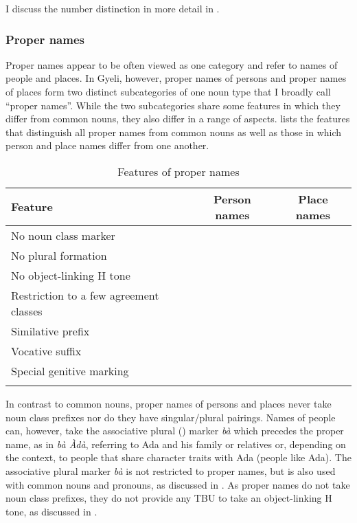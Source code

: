 \noindent I discuss the number distinction in more detail in .






\subsubsection{Proper names}
\largerpage[-2]
\label{sec:properN}


Proper names appear to be often viewed as one category and refer to names of people and places.  In Gyeli, however, proper names of persons and proper names of places form two distinct subcategories of one noun type that I broadly call ``proper names''.  While the two subcategories share some features in which they differ from common nouns, they also differ in a range of aspects.  lists the features that distinguish all proper names from common nouns as well as those in which person and place names differ from one another.


\begin{table}
\begin{tabular}{lcc}
 \lsptoprule
Feature		& 					Person names	& Place names \\
 \midrule
No noun class marker		& 			\checkmark		& 		\checkmark	\\
No plural formation			& 			\checkmark		&		\checkmark	\\
No object-linking H tone		& 			\checkmark		& 		\checkmark	\\
Restriction to a few agreement classes & 		\checkmark		& 		\checkmark	\\\tablevspace
Similative prefix 			& 			\checkmark		& 			\\
Vocative suffix				& 			\checkmark		& 			\\
Special genitive marking		& 			\checkmark		& 			\\
 \lspbottomrule
\end{tabular}
\caption{Features of proper names}
\label{Tab:PropName}
\end{table}

 

In contrast to common nouns, proper names of persons and places never take noun class prefixes nor do they have singular/plural pairings. Names of people can, however, take the associative plural ({\AP}) marker {\itshape bà} which precedes the proper name, as in {\itshape bà Àdà}, referring to Ada and his family or relatives or, depending on the context, to people that share character traits with Ada (people like Ada). The associative plural marker {\itshape bà} is not restricted to proper names, but is also used with common nouns and pronouns, as discussed in . As proper names do not take noun class prefixes, they do not provide any TBU to take an object-linking H tone, as discussed in .

